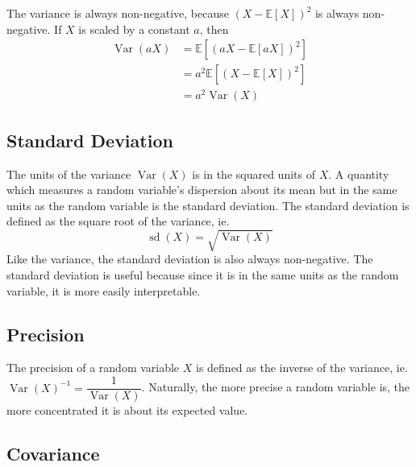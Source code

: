 \documentclass[11pt]{report} %
\begin{document}
The variance is always non-negative, because $\left(X - \mathbb{E}\left[X\right]\right)^{2}$ is always non-negative. If $X$ is scaled by a constant $a$, then
\begin{align}
\operatorname{Var}\left(aX\right) &= \mathbb{E}\left[\left(aX - \mathbb{E}\left[aX\right]\right)^{2}\right] \\
&= a^{2}\mathbb{E}\left[\left(X - \mathbb{E}\left[X\right]\right)^{2}\right] \\
&= a^{2}\operatorname{Var}\left(X\right)
\end{align}

\subsection{Standard Deviation}

The units of the variance $\operatorname{Var}\left(X\right)$ is in the squared units of $X$. A quantity which measures a random variable's dispersion about its mean but in the same units as the random variable is the standard deviation. The standard deviation is defined as the square root of the variance, ie.
\begin{equation}
\operatorname{sd}\left(X\right) = \sqrt{\operatorname{Var}\left(X\right)}
\end{equation}
Like the variance, the standard deviation is also always non-negative. The standard deviation is useful because since it is in the same units as the random variable, it is more easily interpretable.

\subsection{Precision}

The precision of a random variable $X$ is defined as the inverse of the variance, ie. $\operatorname{Var}\left(X\right)^{-1} = \dfrac{1}{\operatorname{Var}\left(X\right)}$. Naturally, the more precise a random variable is, the more concentrated it is about its expected value.

\subsection{Covariance}
\end{document}
